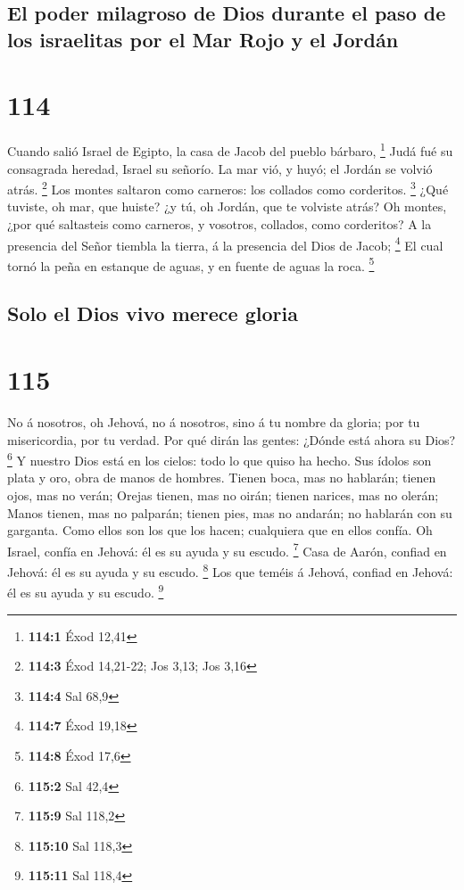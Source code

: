 \hypertarget{el-poder-milagroso-de-dios-durante-el-paso-de-los-israelitas-por-el-mar-rojo-y-el-jorduxe1n}{%
\subsection{El poder milagroso de Dios durante el paso de los israelitas
por el Mar Rojo y el
Jordán}\label{el-poder-milagroso-de-dios-durante-el-paso-de-los-israelitas-por-el-mar-rojo-y-el-jorduxe1n}}

\hypertarget{section-113}{%
\section{114}\label{section-113}}

 Cuando salió Israel de Egipto, la casa de Jacob del pueblo
bárbaro, \footnote{\textbf{114:1} Éxod 12,41}  Judá fué su
consagrada heredad, Israel su señorío.  La mar vió, y huyó;
el Jordán se volvió atrás. \footnote{\textbf{114:3} Éxod 14,21-22; Jos
  3,13; Jos 3,16}  Los montes saltaron como carneros: los
collados como corderitos. \footnote{\textbf{114:4} Sal 68,9}
 ¿Qué tuviste, oh mar, que huiste? ¿y tú, oh Jordán, que te
volviste atrás?  Oh montes, ¿por qué saltasteis como
carneros, y vosotros, collados, como corderitos?  A la
presencia del Señor tiembla la tierra, á la presencia del Dios de Jacob;
\footnote{\textbf{114:7} Éxod 19,18}  El cual tornó la peña
en estanque de aguas, y en fuente de aguas la roca. \footnote{\textbf{114:8}
  Éxod 17,6}

\hypertarget{solo-el-dios-vivo-merece-gloria}{%
\subsection{Solo el Dios vivo merece
gloria}\label{solo-el-dios-vivo-merece-gloria}}

\hypertarget{section-114}{%
\section{115}\label{section-114}}

 No á nosotros, oh Jehová, no á nosotros, sino á tu nombre
da gloria; por tu misericordia, por tu verdad.  Por qué
dirán las gentes: ¿Dónde está ahora su Dios? \footnote{\textbf{115:2}
  Sal 42,4}  Y nuestro Dios está en los cielos: todo lo que
quiso ha hecho.  Sus ídolos son plata y oro, obra de manos
de hombres.  Tienen boca, mas no hablarán; tienen ojos, mas
no verán;  Orejas tienen, mas no oirán; tienen narices, mas
no olerán;  Manos tienen, mas no palparán; tienen pies, mas
no andarán; no hablarán con su garganta.  Como ellos son los
que los hacen; cualquiera que en ellos confía.  Oh Israel,
confía en Jehová: él es su ayuda y su escudo. \footnote{\textbf{115:9}
  Sal 118,2}  Casa de Aarón, confiad en Jehová: él es su
ayuda y su escudo. \footnote{\textbf{115:10} Sal 118,3} 
Los que teméis á Jehová, confiad en Jehová: él es su ayuda y su escudo.
\footnote{\textbf{115:11} Sal 118,4}


